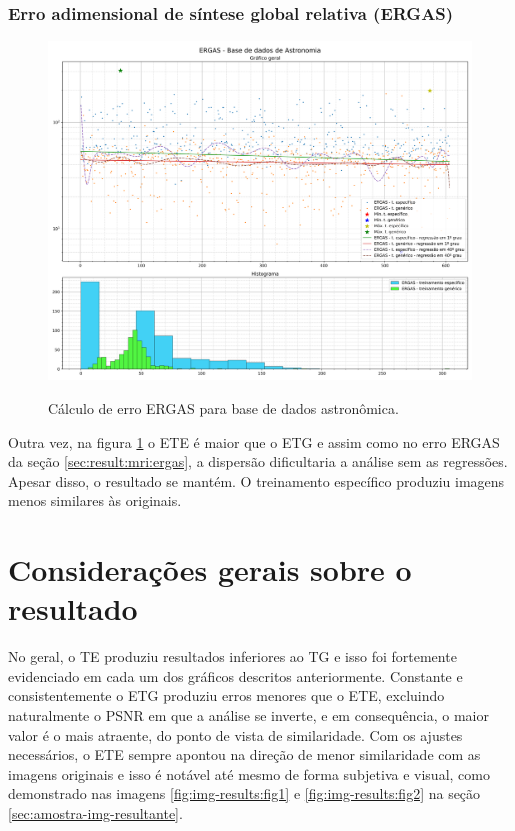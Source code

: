 \subsubsection{Erro adimensional de síntese global relativa (ERGAS)}
\label{sec:result:astronomy:ergas}

\begin{figure}[H]
    \centering
    \caption{Cálculo de erro ERGAS para base de dados astronômica.}
    \includegraphics[width=16cm]{fig/resultados/astronomy/png/ergas_astronomy_compound.png}
    \label{fig:results:fig8}
\end{figure}

Outra vez, na figura \ref{fig:results:fig8} o ETE é maior que o ETG e assim como no erro ERGAS da seção \ref{sec:result:mri:ergas}, a dispersão dificultaria a análise sem as regressões. Apesar disso, o resultado se mantém. O treinamento específico produziu imagens menos similares às originais.

\section{Considerações gerais sobre o resultado}
\label{sec:result:consideracoes-gerais}

No geral, o TE produziu resultados inferiores ao TG e isso foi fortemente evidenciado em cada um dos gráficos descritos anteriormente. Constante e consistentemente o ETG produziu erros menores que o ETE, excluindo naturalmente o PSNR em que a análise se inverte, e em consequência, o maior valor é o mais atraente, do ponto de vista de similaridade. Com os ajustes necessários, o ETE sempre apontou na direção de menor similaridade com as imagens originais e isso é notável até mesmo de forma subjetiva e visual, como demonstrado nas imagens \ref{fig:img-results:fig1} e \ref{fig:img-results:fig2} na seção \ref{sec:amostra-img-resultante}.
